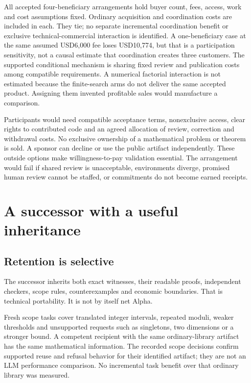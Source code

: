 \documentclass[11pt,a4paper]{article}
\begin{document}
All accepted four-beneficiary arrangements hold buyer count, fees,
access, work and cost assumptions fixed. Ordinary acquisition and
coordination costs are included in each. They tie; no separate
incremental coordination benefit or exclusive technical-commercial
interaction is identified. A one-beneficiary case at the same assumed
USD6,000 fee loses USD10,774, but that is a participation sensitivity,
not a causal estimate that coordination creates three customers. The
supported conditional mechanism is sharing fixed review and publication
costs among compatible requirements. A numerical factorial interaction
is not estimated because the finite-search arms do not deliver the same
accepted product. Assigning them invented profitable sales would
manufacture a comparison.

Participants would need compatible acceptance terms, nonexclusive
access, clear rights to contributed code and an agreed allocation of
review, correction and withdrawal costs. No exclusive ownership of a
mathematical problem or theorem is sold. A sponsor can decline or use
the public artifact independently. These outside options make
willingness-to-pay validation essential. The arrangement would fail if
shared review is unacceptable, environments diverge, promised human
review cannot be staffed, or commitments do not become earned receipts.


\hypertarget{a-successor-with-a-useful-inheritance}{%
\section{A successor with a useful
inheritance}\label{a-successor-with-a-useful-inheritance}}


\hypertarget{retention-is-selective}{%
\subsection{Retention is selective}\label{retention-is-selective}}

The successor inherits both exact witnesses, their readable proofs,
independent checkers, scope rules, counterexamples and economic
boundaries. That is technical portability. It is not by itself net
Alpha.

Fresh scope tasks cover translated integer intervals, repeated moduli,
weaker thresholds and unsupported requests such as singletons, two
dimensions or a stronger bound. A competent recipient with the same
ordinary-library artifact has the same mathematical information. The
recorded scope decisions confirm supported reuse and refusal behavior
for their identified artifact; they are not an LLM performance
comparison. No incremental task benefit over that ordinary library was
measured.
\end{document}
